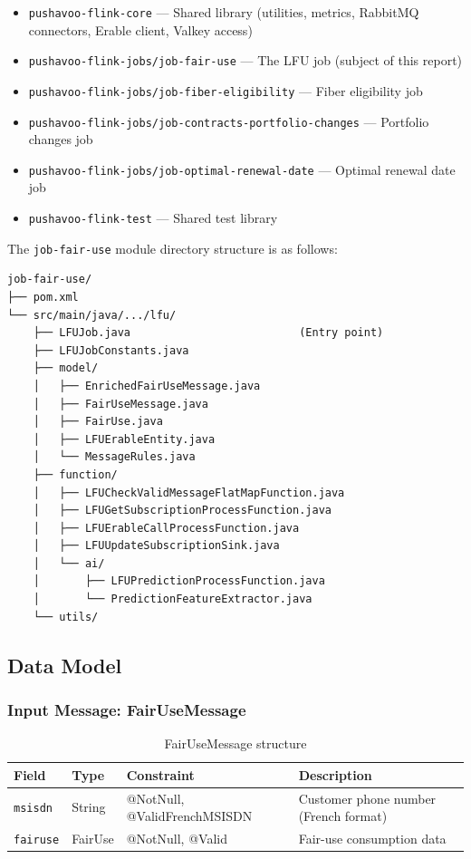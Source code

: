 \begin{itemize}
    \item \texttt{pushavoo-flink-core} --- Shared library (utilities, metrics, RabbitMQ connectors, Erable client, Valkey access)
    \item \texttt{pushavoo-flink-jobs/job-fair-use} --- The LFU job (subject of this report)
    \item \texttt{pushavoo-flink-jobs/job-fiber-eligibility} --- Fiber eligibility job
    \item \texttt{pushavoo-flink-jobs/job-contracts-portfolio-changes} --- Portfolio changes job
    \item \texttt{pushavoo-flink-jobs/job-optimal-renewal-date} --- Optimal renewal date job
    \item \texttt{pushavoo-flink-test} --- Shared test library
\end{itemize}

The \texttt{job-fair-use} module directory structure is as follows:

\begin{verbatim}
job-fair-use/
├── pom.xml
└── src/main/java/.../lfu/
    ├── LFUJob.java                          (Entry point)
    ├── LFUJobConstants.java
    ├── model/
    │   ├── EnrichedFairUseMessage.java
    │   ├── FairUseMessage.java
    │   ├── FairUse.java
    │   ├── LFUErableEntity.java
    │   └── MessageRules.java
    ├── function/
    │   ├── LFUCheckValidMessageFlatMapFunction.java
    │   ├── LFUGetSubscriptionProcessFunction.java
    │   ├── LFUErableCallProcessFunction.java
    │   ├── LFUUpdateSubscriptionSink.java
    │   └── ai/
    │       ├── LFUPredictionProcessFunction.java
    │       └── PredictionFeatureExtractor.java
    └── utils/
\end{verbatim}

\subsection{Data Model}

\subsubsection{Input Message: FairUseMessage}

\begin{table}[H]
    \centering
    \caption{FairUseMessage structure}
    \label{tab:fairusemessage}
    \begin{tabularx}{\textwidth}{l l l X}
\toprule
\textbf{Field} & \textbf{Type} & \textbf{Constraint} & \textbf{Description} \\
\midrule
\texttt{msisdn} & String & @NotNull, @ValidFrenchMSISDN & Customer phone number (French format) \\
\texttt{fairuse} & FairUse & @NotNull, @Valid & Fair-use consumption data \\
\bottomrule
    \end{tabularx}
\end{table}

